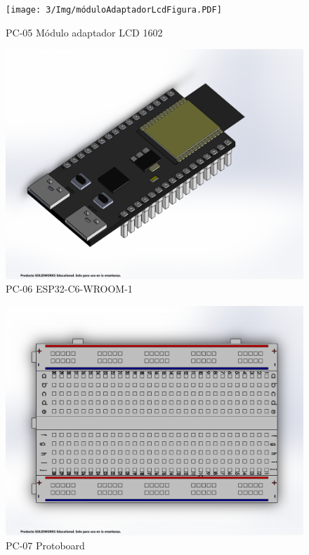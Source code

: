     \begin{figure}[H]
        \centering
        \texttt{[image: 3/Img/móduloAdaptadorLcdFigura.PDF]}
        \caption{PC-05 Módulo adaptador LCD 1602}
        \label{fig:móduloAdaptadorLcdFigura}
    \end{figure}
    \begin{figure}[H]
        \centering
        \includegraphics[trim = {1mm 10mm 20mm 1mm},clip,scale=0.2]{3/Img/esp32Figura.PDF}
        \caption{PC-06 ESP32-C6-WROOM-1}
        \label{fig:esp32Figura}
    \end{figure}
    \begin{figure}[H]
        \centering
        \includegraphics[trim = {1mm 10mm 1mm 1mm},clip,scale=0.2]{3/Img/protoboardFigura.PDF}
        \caption{PC-07 Protoboard}
        \label{fig:protoboardFigura}
    \end{figure}
